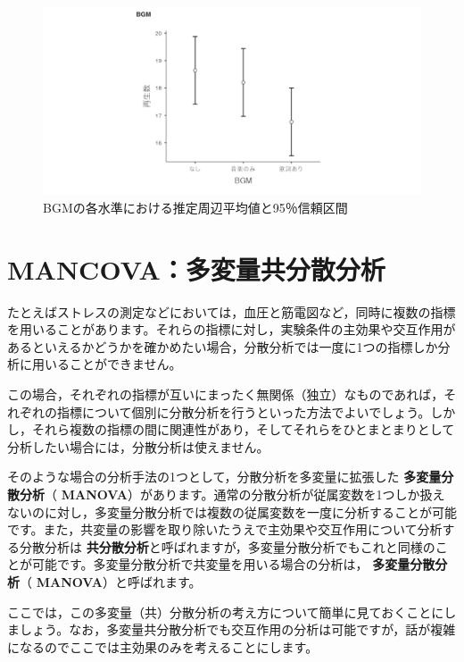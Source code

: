 \documentclass[
  12pt,
  a5jpaper,
  lualatex, ja=standard]{bxjsbook}
\renewcommand{\emph}[1]{\textbf{\color{emph} #1}}
\begin{document}
\begin{figure}[!ht]

{\centering \includegraphics[width=1\linewidth]{images/ANOVA/ancova-emm} 

}

\caption{BGMの各水準における推定周辺平均値と95％信頼区間}\label{fig:ANOVA-ancova-emm}
\end{figure}

\hypertarget{sec:ANOVA-macnova}{%
\section{MANCOVA：多変量共分散分析}\label{sec:ANOVA-macnova}}

たとえばストレスの測定などにおいては，血圧と筋電図など，同時に複数の指標を用いることがあります。それらの指標に対し，実験条件の主効果や交互作用があるといえるかどうかを確かめたい場合，分散分析では一度に1つの指標しか分析に用いることができません。

この場合，それぞれの指標が互いにまったく無関係（独立）なものであれば，それぞれの指標について個別に分散分析を行うといった方法でよいでしょう。しかし，それら複数の指標の間に関連性があり，そしてそれらをひとまとまりとして分析したい場合には，分散分析は使えません。

そのような場合の分析手法の1つとして，分散分析を多変量に拡張した\emph{多変量分散分析}（\emph{MANOVA}）があります。通常の分散分析が従属変数を1つしか扱えないのに対し，多変量分散分析では複数の従属変数を一度に分析することが可能です。また，共変量の影響を取り除いたうえで主効果や交互作用について分析する分散分析は\emph{共分散分析}と呼ばれますが，多変量分散分析でもこれと同様のことが可能です。多変量分散分析で共変量を用いる場合の分析は，\emph{多変量分散分析}（\emph{MANOVA}）と呼ばれます。

ここでは，この多変量（共）分散分析の考え方について簡単に見ておくことにしましょう。なお，多変量共分散分析でも交互作用の分析は可能ですが，話が複雑になるのでここでは主効果のみを考えることにします。
\end{document}
